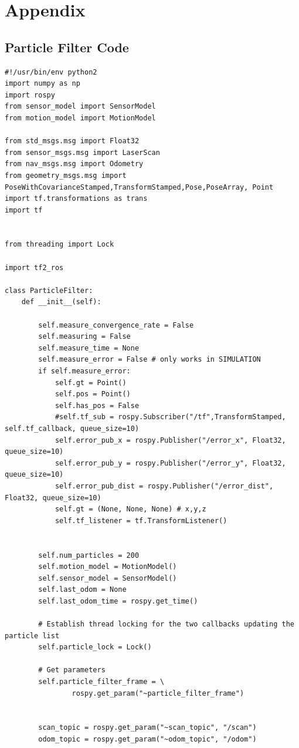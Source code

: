 \documentclass{article}
\begin{document}
\section{Appendix}

\subsection{Particle Filter Code}
{\footnotesize
\begin{verbatim}
#!/usr/bin/env python2
import numpy as np
import rospy
from sensor_model import SensorModel
from motion_model import MotionModel

from std_msgs.msg import Float32
from sensor_msgs.msg import LaserScan
from nav_msgs.msg import Odometry
from geometry_msgs.msg import PoseWithCovarianceStamped,TransformStamped,Pose,PoseArray, Point
import tf.transformations as trans
import tf


from threading import Lock

import tf2_ros

class ParticleFilter:
    def __init__(self):

        self.measure_convergence_rate = False
        self.measuring = False
        self.measure_time = None
        self.measure_error = False # only works in SIMULATION
        if self.measure_error:
            self.gt = Point()
            self.pos = Point()
            self.has_pos = False
            #self.tf_sub = rospy.Subscriber("/tf",TransformStamped, self.tf_callback, queue_size=10)
            self.error_pub_x = rospy.Publisher("/error_x", Float32, queue_size=10)
            self.error_pub_y = rospy.Publisher("/error_y", Float32, queue_size=10)
            self.error_pub_dist = rospy.Publisher("/error_dist", Float32, queue_size=10)
            self.gt = (None, None, None) # x,y,z
            self.tf_listener = tf.TransformListener()


        self.num_particles = 200
        self.motion_model = MotionModel()
        self.sensor_model = SensorModel()
        self.last_odom = None
        self.last_odom_time = rospy.get_time()

        # Establish thread locking for the two callbacks updating the particle list
        self.particle_lock = Lock()
    
        # Get parameters
        self.particle_filter_frame = \
                rospy.get_param("~particle_filter_frame")


        scan_topic = rospy.get_param("~scan_topic", "/scan")
        odom_topic = rospy.get_param("~odom_topic", "/odom")


\end{verbatim}}
\end{document}
